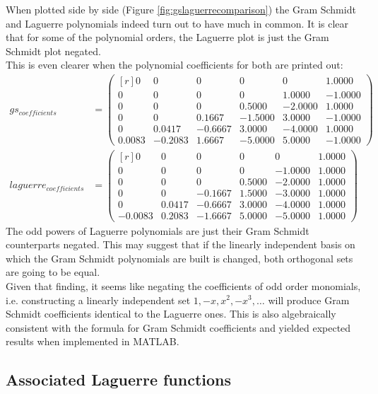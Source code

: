 \documentclass[a4paper]{article}
\numberwithin{equation}{section}
\begin{document}
\noindent When plotted side by side (Figure \ref{fig:gslaguerrecomparison}) the Gram Schmidt and Laguerre polynomials indeed turn out to have much in common. It is clear that for some of the polynomial orders, the Laguerre plot is just the Gram Schmidt plot negated. \\
This is even clearer when the polynomial coefficients for both are printed out:
\begin{align}
gs_{coefficients} &= 
\begin{pmatrix*}[r]
  0 & 0 & 0 & 0 & 0 & 1.0000 \\
  0 & 0 & 0 & 0 & 1.0000 & -1.0000 \\
  0 & 0 & 0 & 0.5000 & -2.0000 & 1.0000 \\
  0 & 0 & 0.1667 & -1.5000 & 3.0000 & -1.0000 \\
  0 & 0.0417 & -0.6667 & 3.0000 & -4.0000 & 1.0000 \\
  0.0083 & -0.2083 & 1.6667 & -5.0000 & 5.0000 & -1.0000
 \end{pmatrix*}
\\
laguerre_{coefficients} &= 
\begin{pmatrix*}[r]
  0 & 0 & 0 & 0 & 0 & 1.0000 \\
  0 & 0 & 0 & 0 & -1.0000 & 1.0000 \\
  0 & 0 & 0 & 0.5000 & -2.0000 & 1.0000 \\
  0 & 0 & -0.1667 & 1.5000 & -3.0000 & 1.0000 \\
  0 & 0.0417 & -0.6667 & 3.0000 & -4.0000 & 1.0000 \\
  -0.0083 & 0.2083 & -1.6667 & 5.0000 & -5.0000 & 1.0000
 \end{pmatrix*}
\end{align}
The odd powers of Laguerre polynomials are just their Gram Schmidt counterparts negated. This may suggest that if the linearly independent basis on which the Gram Schmidt polynomials are built is changed, both orthogonal sets are going to be equal. \\
Given that finding, it seems like negating the coefficients of odd order monomials, i.e. constructing a linearly independent set $1, -x, x^2, -x^3, \ldots$ will produce Gram Schmidt coefficients identical to the Laguerre ones. This is also algebraically consistent with the formula for Gram Schmidt coefficients and yielded expected results when implemented in MATLAB. \\

\subsection{Associated Laguerre functions}
\end{document}
